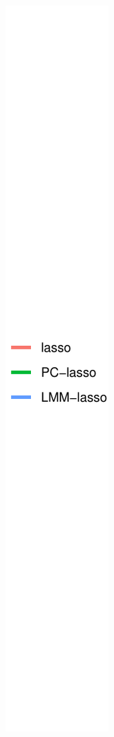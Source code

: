 \begin{figure}[H]
\begin{subfigure}[b]{0.1\textwidth}
         \includegraphics[width=\textwidth]{figures/figure_05c.pdf}
     \end{subfigure}
\end{figure}

